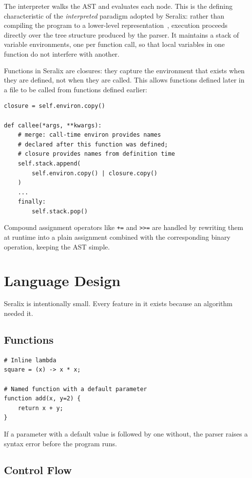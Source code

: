 \documentclass[conference]{IEEEtran}
\begin{document}
The interpreter walks the AST and evaluates each node. This is the defining characteristic of the \textit{interpreted} paradigm adopted by Seralix: rather than compiling the program to a lower-level representation~\cite{aho_compilers}, execution proceeds directly over the tree structure produced by the parser. It maintains a stack of variable environments, one per function call, so that local variables in one function do not interfere with another.

Functions in Seralix are closures: they capture the environment that exists when they are defined, not when they are called. This allows functions defined later in a file to be called from functions defined earlier:

\begin{lstlisting}
closure = self.environ.copy()

def callee(*args, **kwargs):
    # merge: call-time environ provides names
    # declared after this function was defined;
    # closure provides names from definition time
    self.stack.append(
        self.environ.copy() | closure.copy()
    )
    ...
    finally:
        self.stack.pop()
\end{lstlisting}

Compound assignment operators like \texttt{+=} and \texttt{>>=} are handled by rewriting them at runtime into a plain assignment combined with the corresponding binary operation, keeping the AST simple.

\section{Language Design}

Seralix is intentionally small. Every feature in it exists because an algorithm needed it.

\subsection{Functions}

\begin{lstlisting}
# Inline lambda
square = (x) -> x * x;

# Named function with a default parameter
function add(x, y=2) {
    return x + y;
}
\end{lstlisting}

If a parameter with a default value is followed by one without, the parser raises a syntax error before the program runs.

\subsection{Control Flow}
\end{document}
